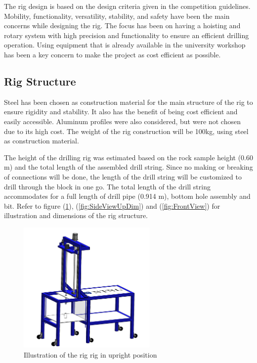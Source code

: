 
The rig design is based on the design criteria given in the competition guidelines. Mobility, functionality, versatility, stability, and safety have been the main concerns while designing the rig. The focus has been on having a hoisting and rotary system with high precision and functionality to ensure an efficient drilling operation. Using equipment that is already available in the university workshop has been a key concern to make the project as cost efficient as possible.

\subsection{Rig Structure}
Steel has been chosen as construction material for the main structure of the rig to ensure rigidity and stability. It also has the benefit of being cost efficient and easily accessible. Aluminum profiles were also considered, but were not chosen due to its high cost. The weight of the rig construction will be 100kg, using steel as construction material.    

The height of the drilling rig was estimated based on the rock sample height (0.60 m) and the total length of the assembled drill string. Since no making or breaking of connections will be done, the length of the drill string will be customized to drill through the block in one go. The total length of the drill string accommodates for a full length of drill pipe (0.914 m), bottom hole assembly and bit. Refer to figure (\ref{fig:SideViewUp}), (\ref{fig:SideViewUpDim}) and (\ref{fig:FrontView}) for illustration and dimensions of the rig structure. 
\begin{figure} [H]
\centering
\includegraphics[width=0.6\textwidth]{figures/SideViewUp.PNG}
\caption{Illustration of the rig rig in upright position}
\label{fig:SideViewUp}
\end{figure}

